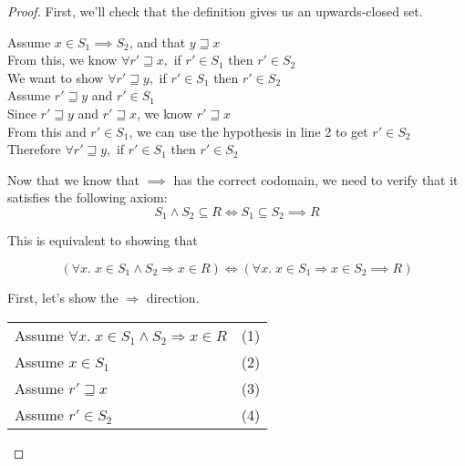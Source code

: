 \begin{proof}
First, we'll check that the definition gives us an upwards-closed set.

\vspace{0.5em}

\begin{tabbedproof}
\oo Assume $x \in S_1 \implies S_2$, and that $y \sqsupseteq x$ \\
\ooo From this, we know $\forall r' \sqsupseteq x, $ if $r' \in S_1$ then $r' \in S_2$ \\
\ooo We want to show $\forall r' \sqsupseteq y, $ if $r' \in S_1$ then $r' \in S_2$ \\
\ooo Assume $r' \sqsupseteq y$ and $r' \in S_1$ \\
\oooo Since $r' \sqsupseteq y$ and $r' \sqsupseteq x$, we know $r' \sqsupseteq x$ \\
\oooo From this  and $r' \in S_1$, we can use the hypothesis in line 2 to get $r' \in S_2$ \\
\ooo Therefore $\forall r' \sqsupseteq y, $ if $r' \in S_1$ then $r' \in S_2$ \\
\end{tabbedproof}

\noindent Now that we know that $\implies$ has the correct codomain, we need to
verify that it satisfies the following axiom: 
\begin{displaymath}
S_1 \land S_2 \subseteq R \iff S_1 \subseteq S_2 \implies R
\end{displaymath}

\noindent This is equivalent to showing that 

\begin{displaymath}
(\forall x.\; x \in S_1 \land S_2 \Rightarrow x \in R) \iff
(\forall x.\; x \in S_1 \Rightarrow x \in S_2 \implies R)
\end{displaymath}

\noindent First, let's show the $\Rightarrow$ direction.
\\

\begin{tabular}{ll}
Assume $\forall x.\; x \in S_1 \land S_2 \Rightarrow x \in R$ &
(1)
\\

Assume $x \in S_1$ &
(2)
\\

Assume $r' \sqsupseteq x$ &
(3)
\\

Assume $r' \in S_2$ & 
(4)
\\


\end{tabular}
\end{proof}
